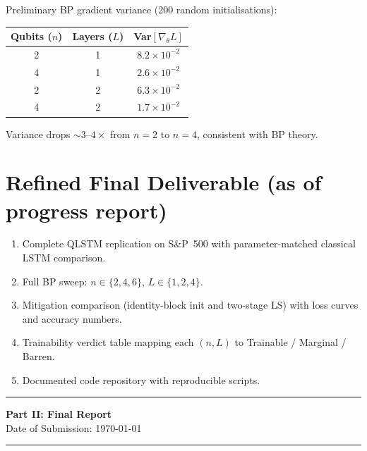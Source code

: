 \documentclass[11pt,a4paper]{article}
\begin{document}
Preliminary BP gradient variance (200 random initialisations):

\begin{center}
\begin{tabular}{@{}ccc@{}}
\toprule
\textbf{Qubits ($n$)} & \textbf{Layers ($L$)} & \textbf{Var$[\nabla_\theta L]$} \\
\midrule
2 & 1 & $8.2 \times 10^{-2}$ \\
4 & 1 & $2.6 \times 10^{-2}$ \\
2 & 2 & $6.3 \times 10^{-2}$ \\
4 & 2 & $1.7 \times 10^{-2}$ \\
\bottomrule
\end{tabular}
\end{center}

Variance drops $\sim\!3$--$4\times$ from $n{=}2$ to $n{=}4$, consistent with BP theory.

\section{Refined Final Deliverable (as of progress report)}

\begin{enumerate}
  \item Complete QLSTM replication on S\&P~500 with parameter-matched classical LSTM comparison.
  \item Full BP sweep: $n \in \{2,4,6\}$, $L \in \{1,2,4\}$.
  \item Mitigation comparison (identity-block init and two-stage LS) with loss curves and accuracy numbers.
  \item Trainability verdict table mapping each $(n,L)$ to Trainable / Marginal / Barren.
  \item Documented code repository with reproducible scripts.
\end{enumerate}


\vspace{8pt}
\noindent\rule{\linewidth}{1pt}
\begin{center}
{\large\bfseries\color{accentblue} Part II: Final Report}\\[2pt]
{\small Date of Submission: \today}
\end{center}
\noindent\rule{\linewidth}{1pt}
\vspace{4pt}
\end{document}

